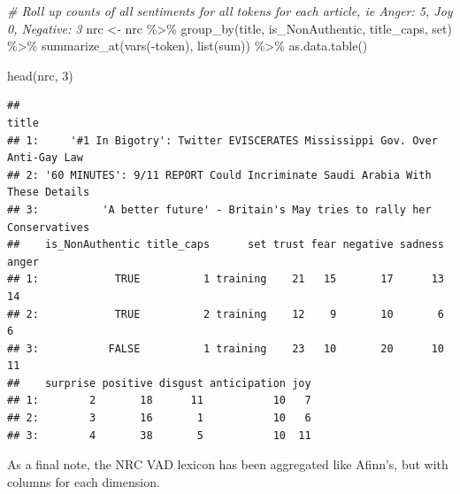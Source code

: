 \documentclass[
]{article}
\newenvironment{Shaded}{\begin{snugshade}}{\end{snugshade}}
\newcommand{\CommentTok}[1]{\textcolor[rgb]{0.56,0.35,0.01}{\textit{#1}}}
\newcommand{\DecValTok}[1]{\textcolor[rgb]{0.00,0.00,0.81}{#1}}
\newcommand{\FunctionTok}[1]{\textcolor[rgb]{0.00,0.00,0.00}{#1}}
\newcommand{\NormalTok}[1]{#1}
\newcommand{\OtherTok}[1]{\textcolor[rgb]{0.56,0.35,0.01}{#1}}
\newcommand{\SpecialCharTok}[1]{\textcolor[rgb]{0.00,0.00,0.00}{#1}}
\begin{document}
\begin{Shaded}
\begin{Highlighting}[]
\CommentTok{\# Roll up counts of all sentiments for all tokens for each article, ie Anger: 5, Joy 0, Negative: 3}
\NormalTok{nrc }\OtherTok{\textless{}{-}}\NormalTok{ nrc }\SpecialCharTok{\%\textgreater{}\%}
  \FunctionTok{group\_by}\NormalTok{(title, is\_NonAuthentic, title\_caps, set) }\SpecialCharTok{\%\textgreater{}\%}
  \FunctionTok{summarize\_at}\NormalTok{(}\FunctionTok{vars}\NormalTok{(}\SpecialCharTok{{-}}\NormalTok{token), }\FunctionTok{list}\NormalTok{(sum)) }\SpecialCharTok{\%\textgreater{}\%}
  \FunctionTok{as.data.table}\NormalTok{()}

\FunctionTok{head}\NormalTok{(nrc, }\DecValTok{3}\NormalTok{)}
\end{Highlighting}
\end{Shaded}

\begin{verbatim}
##                                                                          title
## 1:     '#1 In Bigotry': Twitter EVISCERATES Mississippi Gov. Over Anti-Gay Law
## 2: '60 MINUTES': 9/11 REPORT Could Incriminate Saudi Arabia With These Details
## 3:          'A better future' - Britain's May tries to rally her Conservatives
##    is_NonAuthentic title_caps      set trust fear negative sadness anger
## 1:            TRUE          1 training    21   15       17      13    14
## 2:            TRUE          2 training    12    9       10       6     6
## 3:           FALSE          1 training    23   10       20      10    11
##    surprise positive disgust anticipation joy
## 1:        2       18      11           10   7
## 2:        3       16       1           10   6
## 3:        4       38       5           10  11
\end{verbatim}

As a final note, the NRC VAD lexicon has been aggregated like Afinn's,
but with columns for each dimension.
\end{document}
